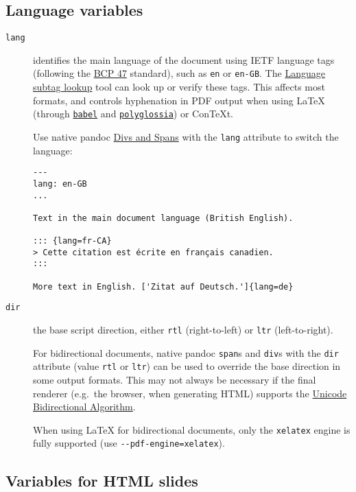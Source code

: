 \documentclass[
  12pt,
  a4paper,
]{article}
\begin{document}
\hypertarget{language-variables}{%
\subsection{Language variables}\label{language-variables}}

\begin{description}
\item[\texttt{lang}]
identifies the main language of the document using IETF language tags (following the
\href{https://tools.ietf.org/html/bcp47}{BCP 47} standard), such as \texttt{en} or \texttt{en-GB}.
The \href{https://r12a.github.io/app-subtags/}{Language subtag lookup} tool can look up or verify
these tags. This affects most formats, and controls hyphenation in PDF output when using LaTeX
(through \href{https://ctan.org/pkg/babel}{\texttt{babel}} and
\href{https://ctan.org/pkg/polyglossia}{\texttt{polyglossia}}) or ConTeXt.

Use native pandoc \protect\hyperlink{divs-and-spans}{Divs and Spans} with the \texttt{lang}
attribute to switch the language:

\begin{verbatim}
---
lang: en-GB
...

Text in the main document language (British English).

::: {lang=fr-CA}
> Cette citation est écrite en français canadien.
:::

More text in English. ['Zitat auf Deutsch.']{lang=de}
\end{verbatim}
\item[\texttt{dir}]
the base script direction, either \texttt{rtl} (right-to-left) or \texttt{ltr} (left-to-right).

For bidirectional documents, native pandoc \texttt{span}s and \texttt{div}s with the \texttt{dir}
attribute (value \texttt{rtl} or \texttt{ltr}) can be used to override the base direction in some
output formats. This may not always be necessary if the final renderer (e.g.~the browser, when
generating HTML) supports the
\href{http://www.w3.org/International/articles/inline-bidi-markup/uba-basics}{Unicode
Bidirectional Algorithm}.

When using LaTeX for bidirectional documents, only the \texttt{xelatex} engine is fully supported
(use \texttt{-\/-pdf-engine=xelatex}).
\end{description}

\hypertarget{variables-for-html-slides}{%
\subsection{Variables for HTML slides}\label{variables-for-html-slides}}
\end{document}
